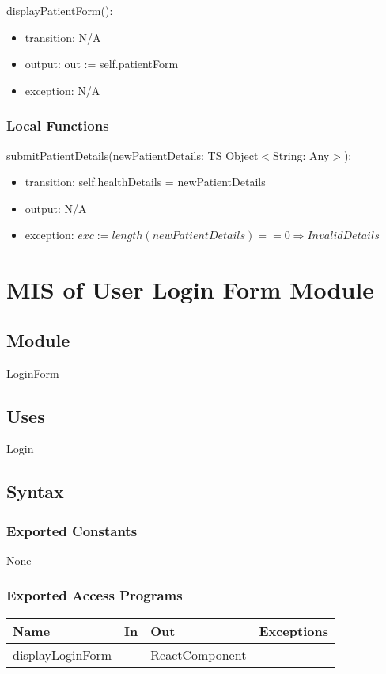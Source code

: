 \documentclass[12pt, titlepage]{article}
\begin{document}
\noindent displayPatientForm():
\begin{itemize}
\item transition: N/A
\item output: out := self.patientForm 
\item exception: N/A
\end{itemize}

\subsubsection{Local Functions}

\noindent submitPatientDetails(newPatientDetails: TS Object$<$String: Any$>$):
\begin{itemize}
\item transition: self.healthDetails = newPatientDetails
\item output: N/A
\item exception: $exc := length(newPatientDetails) == 0 \Rightarrow InvalidDetails$
\end{itemize}


\section{MIS of User Login Form Module} \label{LoginForm}

\subsection{Module}

LoginForm

\subsection{Uses}
Login

\subsection{Syntax}

\subsubsection{Exported Constants}
None

\subsubsection{Exported Access Programs}

\begin{center}
\begin{tabular}{p{4cm} p{4cm} p{4cm} p{4cm}}
\hline
\textbf{Name} & \textbf{In} & \textbf{Out} & \textbf{Exceptions} \\
\hline
displayLoginForm & - & ReactComponent & - \\
\hline
\end{tabular}
\end{center}
\end{document}
